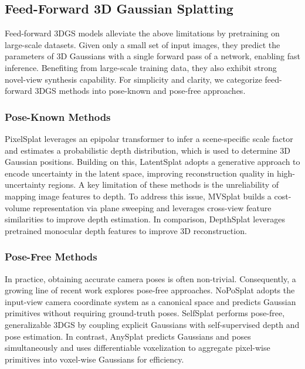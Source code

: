 \documentclass[runningheads]{llncs}
\begin{document}
\subsection{Feed-Forward 3D Gaussian Splatting}
Feed-forward 3DGS models alleviate the above limitations by pretraining on large-scale datasets\cite{zhang2025advances}. Given only a small set of input images, they predict the parameters of 3D Gaussians with a single forward pass of a network, enabling fast inference. Benefiting from large-scale training data, they also exhibit strong novel-view synthesis capability. For simplicity and clarity, we categorize feed-forward 3DGS methods into pose-known and pose-free approaches.
\subsubsection{Pose-Known Methods}
PixelSplat\cite{charatan2024pixelsplat} leverages an epipolar transformer to infer a scene-specific scale factor and estimates a probabilistic depth distribution, which is used to determine 3D Gaussian positions. Building on this, LatentSplat\cite{wewer2024latentsplat} adopts a generative approach to encode uncertainty in the latent space, improving reconstruction quality in high-uncertainty regions. A key limitation of these methods is the unreliability of mapping image features to depth. To address this issue, MVSplat\cite{chen2024mvsplat} builds a cost-volume representation via plane sweeping and leverages cross-view feature similarities to improve depth estimation. In comparison, DepthSplat\cite{xu2025depthsplat} leverages pretrained monocular depth features to improve 3D reconstruction.

\subsubsection{Pose-Free Methods}
In practice, obtaining accurate camera poses is often non-trivial. Consequently, a growing line of recent work explores pose-free approaches. NoPoSplat\cite{ye2024no} adopts the input-view camera coordinate system as a canonical space and predicts Gaussian primitives without requiring ground-truth poses. SelfSplat\cite{kang2025selfsplat} performs pose-free, generalizable 3DGS by coupling explicit Gaussians with self-supervised depth and pose estimation. In contrast, AnySplat\cite{jiang2025anysplat} predicts Gaussians and poses simultaneously and uses differentiable voxelization to aggregate pixel-wise primitives into voxel-wise Gaussians for efficiency.
\end{document}
